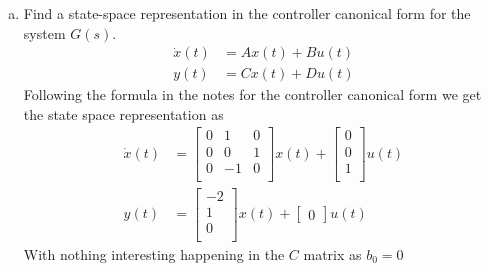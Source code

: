 \documentclass{article}
\begin{document}
\begin{enumerate}[(a)]
\item Find a state-space representation in the controller canonical form for the system $G(s)$.
\begin{align*}
\dot{x}(t) &= Ax(t) + Bu(t) \\
y(t) &= Cx(t) + Du(t)
\end{align*}
\newline
Following the formula in the notes for the controller canonical form we get the state space representation as
\begin{align*}
\dot{x}(t)
&=
\begin{bmatrix}
0 &  1 & 0 \\
0 &  0 & 1 \\
0 & -1 & 0 \\
\end{bmatrix}
x(t)
+
\begin{bmatrix}
0 \\
0 \\
1 \\
\end{bmatrix}
u(t)
\\
y(t)
&=
\begin{bmatrix}
-2 \\
 1 \\
 0 \\
\end{bmatrix}
x(t)
+
\begin{bmatrix}
0
\end{bmatrix}
u(t)
\end{align*}
With nothing interesting happening in the $C$ matrix as $b_0 = 0$



\end{enumerate}
\end{document}
